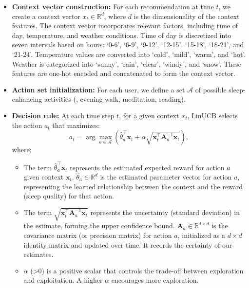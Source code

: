 \begin{itemize}
    \item \textbf{Context vector construction:} For each recommendation at time $t$, we create a context vector $x_t \in \mathbb{R}^d$, where $d$ is the dimensionality of the context features. The context vector incorporates relevant factors, including time of day, temperature, and weather conditions. Time of day is discretized into seven intervals based on hours: `0-6', `6-9', `9-12', `12-15', `15-18', `18-21', and `21-24'.
    Temperature values are converted into `cold', `mild', `warm', and `hot'.
    Weather is categorized into `sunny',
    `rain', `clear', `windy', and `snow'.
    These features are one-hot encoded and concatenated to form the context vector.
    \item \textbf{Action set initialization:} For each user, we define a set $\mathcal{A}$ of possible sleep-enhancing activities (\eg, evening walk, meditation, reading).

    \item \textbf{Decision rule:} At each time step $t$, for a given context $x_t$, LinUCB selects the action $a_t$ that maximizes:
    \[
    a_t = \arg\max_{a \in \mathcal{A}} \left( \hat{\theta}_a^\top \mathbf{x}_t + \alpha \sqrt{\mathbf{x}_t^\top \mathbf{A}_a^{-1} \mathbf{x}_t} \right),
    \]
    where:
    \begin{itemize}
        \item The term $\hat{\theta}_a^\top \mathbf{x}_t$ represents the estimated expected reward for action $a$ given context $\mathbf{x}_t$. $\hat{\theta}_a \in \mathbb{R}^d$ is the estimated parameter vector for action $a$, representing the learned relationship between the context and the reward (sleep quality) for that action.
        
        \item The term $\sqrt{\mathbf{x}_t^\top \mathbf{A}_a^{-1} \mathbf{x}_t}$ represents the uncertainty (standard deviation) in the estimate, forming the upper confidence bound. $\mathbf{A}_a \in \mathbb{R}^{d \times d}$ is the covariance matrix (or precision matrix) for action $a$, initialized as a $d \times d$ identity matrix and updated over time. It records the certainty of our estimates.
        
        \item $\alpha$ (>0) is a positive scalar that controls the trade-off between exploration and exploitation. A higher $\alpha$ encourages more exploration.
        
    \end{itemize}
    

\end{itemize}
